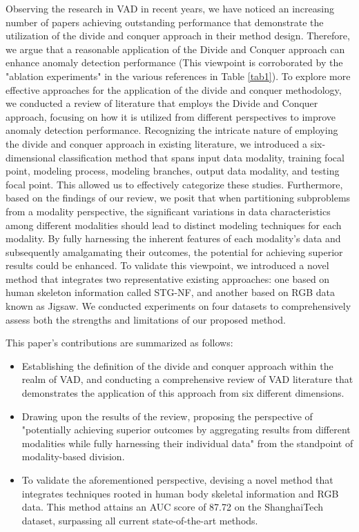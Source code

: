 \documentclass[conference]{IEEEtran}
\begin{document}
Observing the research in VAD in recent years, we have noticed an increasing number of papers achieving outstanding performance that demonstrate the utilization of the divide and conquer approach in their method design. Therefore, we argue that a reasonable application of the Divide and Conquer approach can enhance anomaly detection performance (This viewpoint is corroborated by the "ablation experiments" in the various references in Table \ref{tab1}). To explore more effective approaches for the application of the divide and conquer methodology, we conducted a review of literature that employs the Divide and Conquer approach, focusing on how it is utilized from different perspectives to improve anomaly detection performance. Recognizing the intricate nature of employing the divide and conquer approach in existing literature, we introduced a six-dimensional classification method that spans input data modality, training focal point, modeling process, modeling branches, output data modality, and testing focal point. This allowed us to effectively categorize these studies. Furthermore, based on the findings of our review, we posit that when partitioning subproblems from a modality perspective, the significant variations in data characteristics among different modalities should lead to distinct modeling techniques for each modality. By fully harnessing the inherent features of each modality's data and subsequently amalgamating their outcomes, the potential for achieving superior results could be enhanced. To validate this viewpoint, we introduced a novel method that integrates two representative existing approaches: one based on human skeleton information called STG-NF\cite{STG-NF}, and another based on RGB data known as Jigsaw\cite{jigsaw}. We conducted experiments on four datasets to comprehensively assess both the strengths and limitations of our proposed method.






This paper's contributions are summarized as follows:
\begin{itemize}
\item Establishing the definition of the divide and conquer approach within the realm of VAD, and conducting a comprehensive review of VAD literature that demonstrates the application of this approach from six different dimensions.
\item Drawing upon the results of the review, proposing the perspective of "potentially achieving superior outcomes by aggregating results from different modalities while fully harnessing their individual data" from the standpoint of modality-based division.
\item To validate the aforementioned perspective, devising a novel method that integrates techniques rooted in human body skeletal information and RGB data. This method attains an AUC score of 87.72 on the ShanghaiTech\cite{shanghaitech} dataset, surpassing all current state-of-the-art methods.
\end{itemize}
\end{document}

